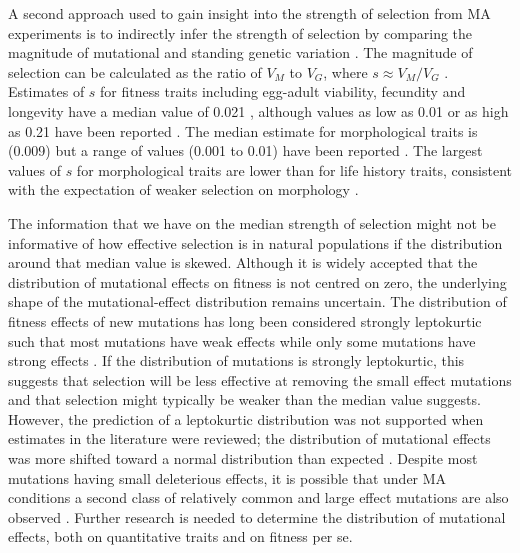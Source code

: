 A second approach used to gain insight into the strength of selection from MA experiments is to indirectly infer the strength of selection by comparing the magnitude of mutational and standing genetic variation \citep{Hall09}. The magnitude of selection can be calculated as the ratio of $V_M$ to $V_G$, where $s \approx V_M/V_G$ \citep{Bart90, char15}. Estimates of $s$ for fitness traits including egg-adult viability, fecundity and longevity have a median value of 0.021 \citep{Houl96}, although values as low as 0.01 or as high as 0.21 have been reported \citep{Muka72, Garc99}. The median estimate for morphological traits is (0.009) but a range of values (0.001 to 0.01) have been reported \citep{Houl96}. The largest values of $s$ for morphological traits are lower than for life history traits, consistent with the expectation of weaker selection on morphology \citep{Houl96}.  

The information that we have on the median strength of selection might not be informative of how effective selection is in natural populations if the distribution around that median value is skewed. Although it is widely accepted that the distribution of mutational effects on fitness is not centred on zero, the underlying shape of the mutational-effect distribution remains uncertain. The distribution of fitness effects of new mutations has long been considered strongly leptokurtic such that most mutations have weak effects while only some mutations have strong effects \citep{Kimu65, Robe67}. If the distribution of mutations is strongly leptokurtic, this suggests that selection will be less effective at removing the small effect mutations and that selection might typically be weaker than the median value suggests. However, the prediction of a leptokurtic distribution was not supported when estimates in the literature were reviewed; the distribution of mutational effects was more shifted toward a normal distribution than expected \citep{Hall09}. Despite most mutations having small deleterious effects, it is possible that under MA conditions a second class of relatively common and large effect mutations are also observed \citep{Hall09}. Further research is needed to determine the distribution of mutational effects, both on quantitative traits and on fitness per se.  \par

